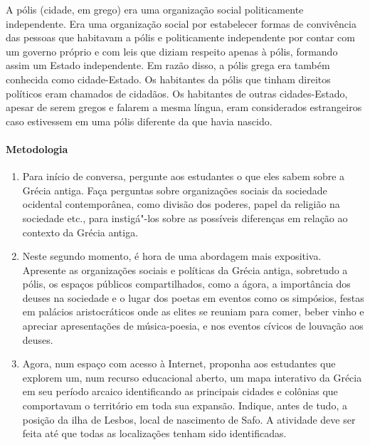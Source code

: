 \documentclass[12pt]{extarticle}
\begin{document}
A pólis (cidade, em grego) era uma organização social politicamente independente. 
Era uma organização social por estabelecer formas de convivência das pessoas que 
habitavam a pólis e politicamente independente por contar com um governo próprio 
e com leis que diziam respeito apenas à pólis, formando assim um Estado independente. 
Em razão disso, a pólis grega era também conhecida como cidade-Estado. Os habitantes 
da pólis que tinham direitos políticos eram chamados de cidadãos. Os habitantes de outras 
cidades-Estado, apesar de serem gregos e falarem a mesma língua, eram considerados 
estrangeiros caso estivessem em uma pólis diferente da que havia nascido.

\paragraph{Metodologia}

\begin{enumerate}

	\item Para início de conversa, pergunte aos estudantes o que eles sabem sobre a Grécia
	antiga. Faça perguntas sobre organizações sociais da sociedade ocidental 
	contemporânea, como divisão dos poderes, papel da religião na sociedade etc.,
	para instigá"-los sobre as possíveis diferenças em relação ao contexto da Grécia
	antiga.

	\item Neste segundo momento, é hora de uma abordagem mais expositiva. Apresente
	as organizações sociais e políticas da Grécia antiga, sobretudo a pólis, os espaços
	públicos compartilhados, como a ágora, a importância dos deuses na sociedade e 
	o lugar dos poetas em eventos como os simpósios, festas em palácios aristocráticos
	onde as elites se reuniam para comer, beber vinho e apreciar apresentações
	de música-poesia, e nos eventos cívicos de louvação aos deuses. 

	\item Agora, num espaço com acesso à Internet, proponha aos estudantes que explorem 
	um, num recurso educacional aberto, um mapa interativo da Grécia em seu período 
	arcaico identificando as principais cidades e colônias que comportavam o território
	em toda sua expansão. Indique, antes de tudo, a posição da ilha de Lesbos, local de 
	nascimento de Safo. A atividade deve ser feita até que todas as localizações
	tenham sido identificadas.


\end{enumerate}
\end{document}
